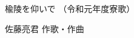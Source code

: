 \documentclass[10pt,b5j]{tarticle} %
\begin{document}
\begin{minipage}[c]{0.7\hsize} %
    \begin{center}
        {\LARGE
            楡陵を仰いで %
        }
        {\small 
            （令和元年度寮歌） %
        }
    \end{center}
\end{minipage}
\begin{minipage}[c]{0.3\hsize} %
    \begin{flushright} %
        佐藤亮君 作歌・作曲 %
    \end{flushright}
\end{minipage}
\end{document}
